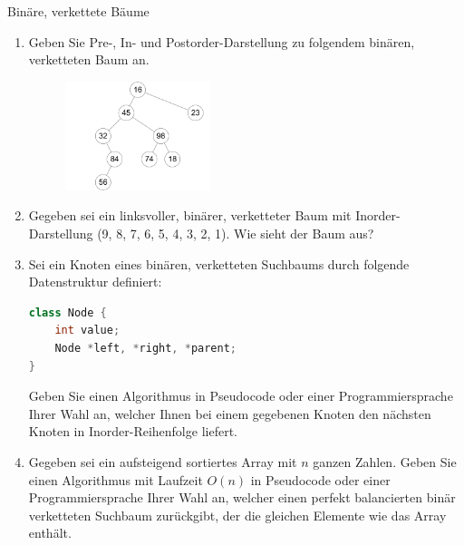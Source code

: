 \documentclass[11pt,a4paper]{article}
\begin{document}
\begin{aufgabe}{5}{Binäre, verkettete Bäume}
    \begin{enumerate}
        \item Geben Sie Pre-, In- und Postorder-Darstellung zu folgendem binären, verketteten Baum an.
        \begin{figure}[h!]
            \centering
            \includegraphics[width=0.4\textwidth]{img/4a_neu}
        \end{figure}
        \FloatBarrier
        \item Gegeben sei ein linksvoller, binärer, verketteter Baum mit Inorder-Darstellung (9, 8, 7, 6, 5, 4, 3, 2, 1).
        Wie sieht der Baum aus?
        \item \hard Sei ein Knoten eines binären, verketteten Suchbaums durch folgende Datenstruktur definiert:
        \begin{lstlisting}[language=c++]
class Node {
    int value;
    Node *left, *right, *parent;
} 
        \end{lstlisting}
        Geben Sie einen Algorithmus in Pseudocode oder einer Programmiersprache Ihrer Wahl an, welcher Ihnen bei einem gegebenen Knoten den nächsten Knoten in Inorder-Reihenfolge liefert.
        \item
        \hard Gegeben sei ein aufsteigend sortiertes Array mit $n$ ganzen Zahlen.
        Geben Sie einen Algorithmus mit Laufzeit $O(n)$ in Pseudocode oder einer Programmiersprache Ihrer Wahl an, welcher einen perfekt balancierten binär verketteten Suchbaum zurückgibt, der die gleichen Elemente wie das Array enthält.
    \end{enumerate}
\end{aufgabe}
\end{document}

